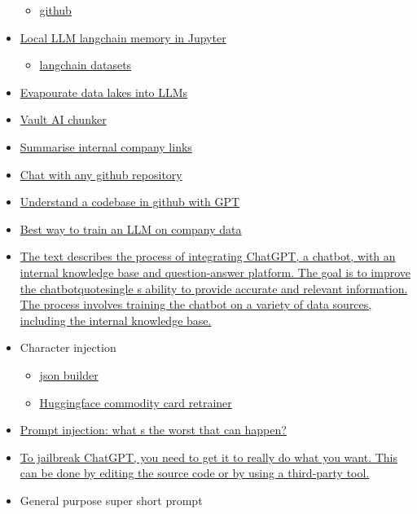 \begin{itemize}
  \begin{itemize}
   
  \item
    \href{https://github.com/booydar/t5-experiments}{github}
  \end{itemize}
\item
  \href{https://github.com/ausboss/Local-LLM-Langchain}{Local LLM
  langchain memory in Jupyter}

  \begin{itemize}
   
  \item
    \href{https://huggingface.co/LangChainDatasets}{langchain datasets}
  \end{itemize}
\item
  \href{https://github.com/HazyResearch/evaporate}{Evapourate data lakes
  into LLMs}
\item
  \href{https://github.com/pashpashpash/vault-ai}{Vault AI chunker}
\item
  \href{https://powerusers.microsoft.com/t5/Calling-Actions-from-PVA/Use-GPT-ChatGPT-to-summarize-and-reference-the-results-from-an/td-p/2101639}{Summarise
  internal company links}
\item
  \href{https://www.reddit.com/r/MachineLearning/comments/12oh07a/p_chat_with_any_github_repo_code_understanding/}{Chat
  with any github repository}
\item
  \href{https://useadrenaline.com/app}{Understand a codebase in github
  with GPT}
\item
  \href{https://www.reddit.com/r/MachineLearning/comments/125qztx/d_the_best_way_to_train_an_llm_on_company_data/}{Best
  way to train an LLM on company data}
\item
  \href{https://medium.com/singapore-gds/integrating-chatgpt-with-internal-knowledge-base-and-question-answer-platform-36a3283d6334}{The
  text describes the process of integrating ChatGPT, a chatbot, with an
  internal knowledge base and question-answer platform. The goal is to
  improve the chatbotquotesingle s ability to provide accurate and
  relevant information. The process involves training the chatbot on a
  variety of data sources, including the internal knowledge base.}
\item
  Character injection

  \begin{itemize}
   
  \item
    \href{https://oobabooga.github.io/character-creator.html}{json
    builder}
  \item
    \href{https://huggingface.co/blog/trl-peft}{Huggingface commodity
    card retrainer}
  \end{itemize}
\item
  \href{https://simonwillison.net/2023/Apr/14/worst-that-can-happen/}{Prompt
  injection: what s the worst that can happen?}
\item
  \href{https://www.digitaltrends.com/computing/how-to-jailbreak-chatgpt/}{To
  jailbreak ChatGPT, you need to get it to really do what you want. This
  can be done by editing the source code or by using a third-party
  tool.}
\item
  General purpose super short prompt


\end{itemize}
